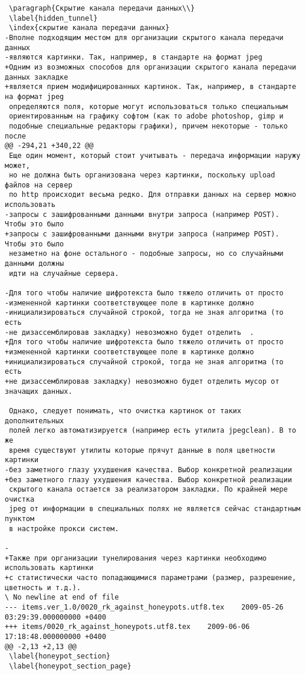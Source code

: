 \begin{verbatim}
 \paragraph{Скрытие канала передачи данных\\}
 \label{hidden_tunnel}
 \index{скрытие канала передачи данных}
-Вполне подходящим местом для организации скрытого канала передачи данных
-являются картинки. Так, например, в стандарте на формат jpeg
+Одним из возможных способов для организации скрытого канала передачи данных закладке
+является прием модифицированных картинок. Так, например, в стандарте на формат jpeg
 определяются поля, которые могут использоваться только специальным
 ориентированным на графику софтом (как то adobe photoshop, gimp и
 подобные специальные редакторы графики), причем некоторые - только после
@@ -294,21 +340,22 @@
 Еще один момент, который стоит учитывать - передача информации наружу может,
 но не должна быть организована через картинки, поскольку upload файлов на сервер
 по http происходит весьма редко. Для отправки данных на сервер можно использовать
-запросы с зашифрованными данными внутри запроса (например POST). Чтобы это было
+запросы с зашифрованными данными внутри запроса (например POST). Чтобы это было
 незаметно на фоне остального - подобные запросы, но со случайными данными должны
 идти на случайные сервера.

-Для того чтобы наличие шифротекста было тяжело отличить от просто
-измененной картинки соответствующее поле в картинке должно
-инициализироваться случайной строкой, тогда не зная алгоритма (то есть
-не дизассемблировав закладку) невозможно будет отделить  .
+Для того чтобы наличие шифротекста было тяжело отличить от просто
+измененной картинки соответствующее поле в картинке должно
+инициализироваться случайной строкой, тогда не зная алгоритма (то есть
+не дизассемблировав закладку) невозможно будет отделить мусор от значащих данных.

 Однако, следует понимать, что очистка картинок от таких дополнительных
 полей легко автоматизируется (например есть утилита jpegclean). В то же
 время существуют утилиты которые прячут данные в поля цветности картинки
-без заметного глазу ухудшения качества. Выбор конкретной реализации
+без заметного глазу ухудшения качества. Выбор конкретной реализации
 скрытого канала остается за реализатором закладки. По крайней мере очистка
 jpeg от информации в специальных полях не является сейчас стандартным пунктом
 в настройке прокси систем.

-
+Также при организации тунелирования через картинки необходимо использовать картинки
+с статистически часто попадающимися параметрами (размер, разрешение, цветность и т.д.).
\ No newline at end of file
--- items.ver_1.0/0020_rk_against_honeypots.utf8.tex	2009-05-26 03:29:39.000000000 +0400
+++ items/0020_rk_against_honeypots.utf8.tex	2009-06-06 17:18:48.000000000 +0400
@@ -2,13 +2,13 @@
 \label{honeypot_section}
 \label{honeypot_section_page}


\end{verbatim}
